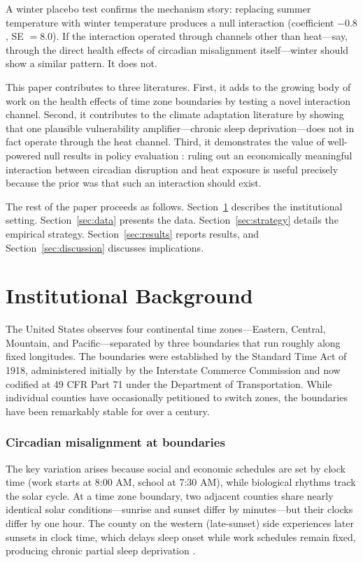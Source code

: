 \documentclass[12pt]{article}
\begin{document}
A winter placebo test confirms the mechanism story: replacing summer temperature with winter temperature produces a null interaction (coefficient $-0.8$, SE $= 8.0$). If the interaction operated through channels other than heat---say, through the direct health effects of circadian misalignment itself---winter should show a similar pattern. It does not.

This paper contributes to three literatures. First, it adds to the growing body of work on the health effects of time zone boundaries \citep{giuntella2019sunset, giuntella2015sleep, jin2021time, costa2023circadian} by testing a novel interaction channel. Second, it contributes to the climate adaptation literature \citep{barreca2016adapting, deschenes2014temperature, heutel2021adaptation, carleton2022valuing} by showing that one plausible vulnerability amplifier---chronic sleep deprivation---does not in fact operate through the heat channel. Third, it demonstrates the value of well-powered null results in policy evaluation \citep{abadie2020statistical}: ruling out an economically meaningful interaction between circadian disruption and heat exposure is useful precisely because the prior was that such an interaction should exist.

The rest of the paper proceeds as follows. Section~\ref{sec:background} describes the institutional setting. Section~\ref{sec:data} presents the data. Section~\ref{sec:strategy} details the empirical strategy. Section~\ref{sec:results} reports results, and Section~\ref{sec:discussion} discusses implications.


\section{Institutional Background}
\label{sec:background}

The United States observes four continental time zones---Eastern, Central, Mountain, and Pacific---separated by three boundaries that run roughly along fixed longitudes. The boundaries were established by the Standard Time Act of 1918, administered initially by the Interstate Commerce Commission and now codified at 49 CFR Part 71 under the Department of Transportation. While individual counties have occasionally petitioned to switch zones, the boundaries have been remarkably stable for over a century.

\subsubsection*{Circadian misalignment at boundaries} The key variation arises because social and economic schedules are set by clock time (work starts at 8:00 AM, school at 7:30 AM), while biological rhythms track the solar cycle. At a time zone boundary, two adjacent counties share nearly identical solar conditions---sunrise and sunset differ by minutes---but their clocks differ by one hour. The county on the western (late-sunset) side experiences later sunsets in clock time, which delays sleep onset while work schedules remain fixed, producing chronic partial sleep deprivation \citep{giuntella2015sleep, giuntella2019sunset}.
\end{document}
